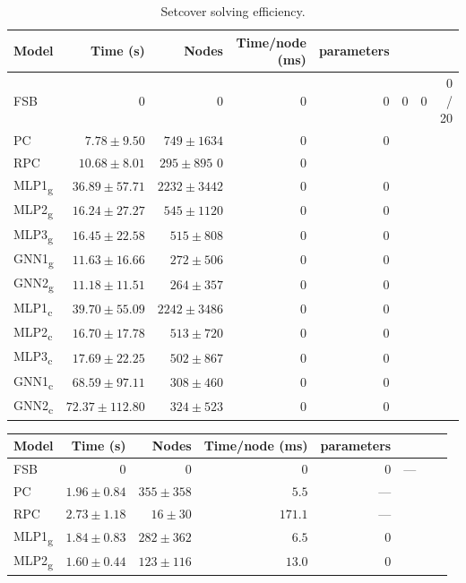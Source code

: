  
\begin{scriptsize}
\begin{table}[ht]
	\centering
	\begin{tabular}{lrrrrrrr}
		\toprule
		Model & Time (s) & Nodes  & Time/node (ms) & parameters \\
		\midrule
		FSB & 0 & 0 & 0 & 0 & 0 & 0 & 0 / 20\\
		PC  & $7.78 \pm 9.50$ & $749 \pm 1634$ & 0 & 0\\
		RPC & $10.68 \pm 8.01$ & $295 \pm 895$ 0 & 0\\
		\addlinespace
		MLP1\textsubscript{g} & $36.89 \pm 57.71$ & $2232 \pm 3442$ & 0 & 0\\
		MLP2\textsubscript{g} & $16.24 \pm 27.27$ & $545 \pm 1120$  & 0 & 0\\
		MLP3\textsubscript{g} & $16.45 \pm 22.58$ & $515 \pm 808 $  & 0 & 0\\
		GNN1\textsubscript{g} & $11.63 \pm 16.66$ & $272 \pm 506 $  & 0 & 0\\
		GNN2\textsubscript{g} & $11.18 \pm 11.51$ & $264 \pm 357 $  & 0 & 0\\
		\addlinespace
		MLP1\textsubscript{c} & $39.70 \pm 55.09$ & $2242 \pm 3486$ & 0 & 0\\
		MLP2\textsubscript{c} & $16.70 \pm 17.78$ & $513 \pm 720$   & 0 & 0\\
		MLP3\textsubscript{c} & $17.69 \pm 22.25$ & $502 \pm 867$   & 0 & 0\\
		GNN1\textsubscript{c} & $68.59 \pm 97.11$ & $308 \pm 460$   & 0 & 0\\
		GNN2\textsubscript{c} & $72.37 \pm 112.80$ & $324 \pm 523$  & 0 & 0\\
		\bottomrule
	\end{tabular}
	\caption{Setcover solving efficiency.}\label{tab:results1_set}
\end{table}
\begin{table}[ht]
	\centering
	\begin{tabular}{lrrrrrrr}
	    \toprule
		Model & Time (s) & Nodes  & Time/node (ms) & parameters \\
		\midrule
		FSB & 0 & 0 & 0 & 0 & --- \\
		PC  & $1.96 \pm 0.84$ & $355 \pm 358$ & $5.5$ & ---\\
		RPC & $2.73 \pm 1.18$ & $16 \pm 30$ & $ 171.1$ & ---\\
		\addlinespace
		MLP1\textsubscript{g} & $1.84 \pm 0.83$ & $282 \pm 362$ & $6.5$  & 0\\
		MLP2\textsubscript{g} & $1.60 \pm 0.44$ & $123 \pm 116$ & $13.0$ & 0\\

\end{tabular}
\end{table}
\end{scriptsize}
